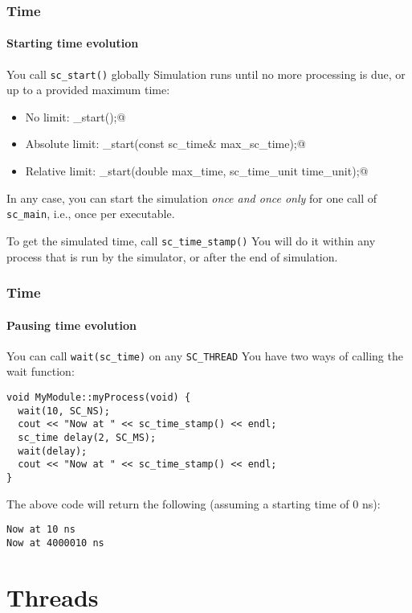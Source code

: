 \begin{frame}[fragile]
\frametitle{Time}
\framesubtitle{Starting time evolution}

\begin{block}{You call \texttt{sc\_start()} globally}
\vspace{0.5em}
Simulation runs until no more processing is due, or up to a provided maximum time:
\begin{itemize}
\item No limit: {\small \verb@sc_start();@ }
\item Absolute limit: {\small \verb@sc_start(const sc_time& max_sc_time);@ }
\item Relative limit: {\small \verb@sc_start(double max_time, sc_time_unit time_unit);@ }
\end{itemize}
In any case, you can start the simulation {\em once and once only} for one call of \texttt{sc\_main}, i.e., once per executable.
\end{block}
\pause
\begin{block}{To get the simulated time, call \texttt{sc\_time\_stamp()}}
You will do it within any process that is run by the simulator, or after the end of simulation.
\end{block}
\end{frame}

\begin{frame}[fragile]
\frametitle{Time}
\framesubtitle{Pausing time evolution}

\begin{block}{You can call \texttt{wait(sc\_time)} on any \texttt{SC\_THREAD}}
\vspace{0.5em}
You have two ways of calling the wait function:
{\scriptsize 
\begin{verbatim}
void MyModule::myProcess(void) {
  wait(10, SC_NS);
  cout << "Now at " << sc_time_stamp() << endl;
  sc_time delay(2, SC_MS);
  wait(delay);
  cout << "Now at " << sc_time_stamp() << endl;
}
\end{verbatim}
}
\pause
The above code will return the following (assuming a starting time of 0 ns):
{\scriptsize 
\begin{verbatim}
Now at 10 ns
Now at 4000010 ns
\end{verbatim}
}
\end{block}
\end{frame}

\section{Threads}


